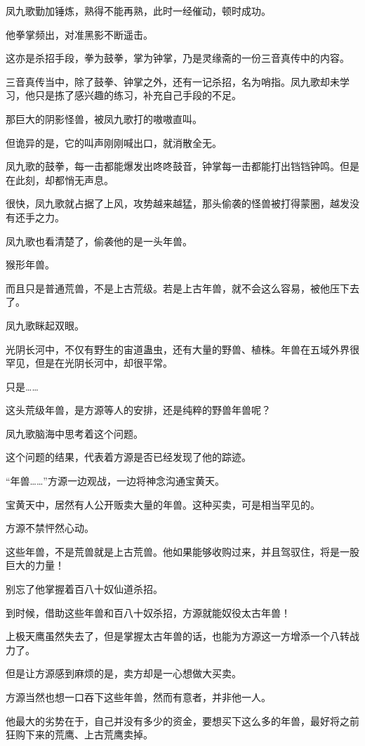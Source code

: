 \begin{this_body}
凤九歌勤加锤炼，熟得不能再熟，此时一经催动，顿时成功。

他拳掌频出，对准黑影不断遥击。

这亦是杀招手段，拳为鼓拳，掌为钟掌，乃是灵缘斋的一份三音真传中的内容。

三音真传当中，除了鼓拳、钟掌之外，还有一记杀招，名为哨指。凤九歌却未学习，他只是拣了感兴趣的练习，补充自己手段的不足。

那巨大的阴影怪兽，被凤九歌打的嗷嗷直叫。

但诡异的是，它的叫声刚刚喊出口，就消散全无。

凤九歌的鼓拳，每一击都能爆发出咚咚鼓音，钟掌每一击都能打出铛铛钟鸣。但是在此刻，却都悄无声息。

很快，凤九歌就占据了上风，攻势越来越猛，那头偷袭的怪兽被打得蒙圈，越发没有还手之力。

凤九歌也看清楚了，偷袭他的是一头年兽。

猴形年兽。

而且只是普通荒兽，不是上古荒级。若是上古年兽，就不会这么容易，被他压下去了。

凤九歌眯起双眼。

光阴长河中，不仅有野生的宙道蛊虫，还有大量的野兽、植株。年兽在五域外界很罕见，但是在光阴长河中，却很平常。

只是……

这头荒级年兽，是方源等人的安排，还是纯粹的野兽年兽呢？

凤九歌脑海中思考着这个问题。

这个问题的结果，代表着方源是否已经发现了他的踪迹。

“年兽……”方源一边观战，一边将神念沟通宝黄天。

宝黄天中，居然有人公开贩卖大量的年兽。这种买卖，可是相当罕见的。

方源不禁怦然心动。

这些年兽，不是荒兽就是上古荒兽。他如果能够收购过来，并且驾驭住，将是一股巨大的力量！

别忘了他掌握着百八十奴仙道杀招。

到时候，借助这些年兽和百八十奴杀招，方源就能奴役太古年兽！

上极天鹰虽然失去了，但是掌握太古年兽的话，也能为方源这一方增添一个八转战力了。

但是让方源感到麻烦的是，卖方却是一心想做大买卖。

方源当然也想一口吞下这些年兽，然而有意者，并非他一人。

他最大的劣势在于，自己并没有多少的资金，要想买下这么多的年兽，最好将之前狂购下来的荒鹰、上古荒鹰卖掉。


\end{this_body}
